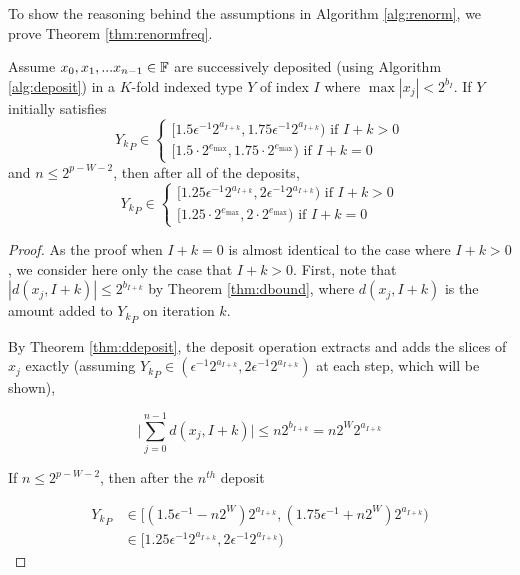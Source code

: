     To show the reasoning behind the assumptions in Algorithm \ref{alg:renorm},
    we prove Theorem \ref{thm:renormfreq}.

      \begin{samepage}
    \begin{thm}
      Assume $x_0, x_1, ... x_{n - 1} \in \mathbb{F}$ are successively deposited (using Algorithm \ref{alg:deposit}) in a $K$-fold indexed type $Y$ of index $I$ where $\max|x_j| < 2^{b_I}$. If $Y$ initially satisfies
       \[
      {Y_k}_P \in \begin{cases}[1.5  \epsilon^{-1} 2^{a_{I + k}}, 1.75  \epsilon^{-1} 2^{a_{I + k}}) \text{ if } I + k > 0 \\ [1.5 \cdot 2^{e_{\max}}, 1.75 \cdot 2^{e_{\max}}) \text{ if } I + k = 0\end{cases}
      \]
       and $n \leq 2^{p - W - 2}$, then after all of the deposits, 
       \[
      {Y_k}_P \in \begin{cases}[1.25  \epsilon^{-1} 2^{a_{I + k}}, 2  \epsilon^{-1} 2^{a_{I + k}}) \text{ if } I + k > 0 \\ [1.25 \cdot 2^{e_{\max}}, 2 \cdot 2^{e_{\max}}) \text{ if } I + k = 0\end{cases}
      \]
      \label{thm:renormfreq}
    \end{thm}
    \end{samepage}

    \begin{proof}
    As the proof when $I + k = 0$ is almost identical to the case where $I + k > 0$, we consider here only the case that $I + k > 0$.
    First, note that $|d(x_j, I + k)| \leq 2^{b_{I + k}}$ by Theorem
    \ref{thm:dbound}, where $d(x_j, I + k)$ is the amount added to ${Y_k}_P$ on
    iteration $k$.

    By Theorem \ref{thm:ddeposit}, the deposit operation extracts and adds the slices of $x_j$ exactly (assuming ${Y_k}_P \in (\epsilon^{-1} 2^{a_{I + k}}, 2  \epsilon^{-1} 2^{a_{I + k}})$ at each step, which will be shown),

    \begin{equation*}
    \bigl|\sum \limits_{j = 0}^{n - 1} d(x_j, I + k)\bigr| \leq n  2^{b_{I + k}} = n  2^{W}  2^{a_{I + k}}
    \end{equation*}

    If $n \leq 2^{p - W - 2}$, then after the $n^{th}$ deposit

    \begin{align*}
    {Y_k}_P &\in \bigl[(1.5  \epsilon^{-1} - n  2^W) 2^{a_{I + k}}, (1.75  \epsilon^{-1} + n  2^W) 2^{a_{I + k}}\bigr) \\
    &\in [1.25  \epsilon^{-1} 2^{a_{I + k}}, 2  \epsilon^{-1} 2^{a_{I + k}})
    \end{align*}
    \end{proof}

